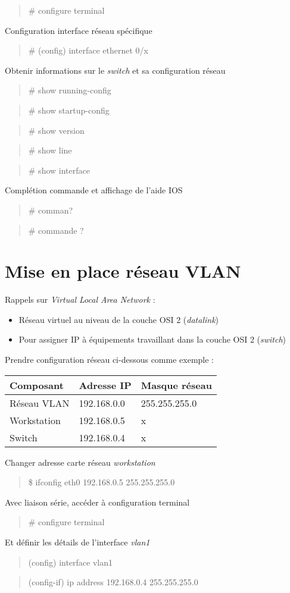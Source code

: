 \documentclass[a4paper, 11pt]{article}
\newcommand{\commande}[1] {
    \begin{quote}
    \tt\raggedright #1
    \end{quote}
}
\begin{document}
\commande{\# configure terminal}

Configuration interface réseau spécifique

\commande{\# (config) interface ethernet 0/x}

Obtenir informations sur le \textit{switch} et sa configuration réseau

\commande{\# show running-config}
\commande{\# show startup-config}
\commande{\# show version}
\commande{\# show line}
\commande{\# show interface}

Complétion commande et affichage de l'aide IOS

\commande{\# comman?}
\commande{\# commande ?}

\section{Mise en place réseau VLAN}

Rappels sur \textit{Virtual Local Area Network} : 

\begin{itemize}
\item Réseau virtuel au niveau de la couche OSI 2 (\textit{datalink})
\item Pour assigner IP à équipements travaillant dans la couche OSI 2 (\textit{switch})
\\
\end{itemize}

Prendre configuration réseau ci-dessous comme exemple : 
\\

\begin{tabular}{|l|l|l|}
  \hline
  Composant & Adresse IP & Masque réseau \\
  \hline
  Réseau VLAN & 192.168.0.0 & 255.255.255.0 \\
  Workstation & 192.168.0.5 & x \\
  Switch & 192.168.0.4 & x \\
  \hline
\end{tabular}

\bigbreak
Changer adresse carte réseau \textit{workstation}

\commande{\$ ifconfig eth0 192.168.0.5 255.255.255.0}

Avec liaison série, accéder à configuration terminal

\commande{\# configure terminal}

Et définir les détails de l'interface \textit{vlan1}

\commande{(config) interface vlan1}
\commande{(config-if) ip address 192.168.0.4 255.255.255.0}
\end{document}
